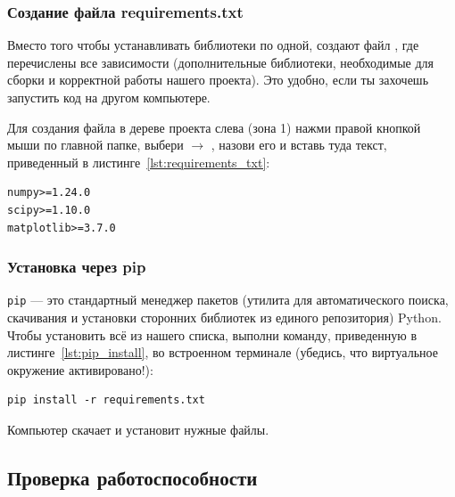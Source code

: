 \subsubsection{Создание файла requirements.txt}

Вместо того чтобы устанавливать библиотеки по одной, создают файл , где перечислены все зависимости (дополнительные библиотеки, необходимые для сборки и корректной работы нашего проекта). Это удобно, если ты захочешь запустить код на другом компьютере.

Для создания файла в дереве проекта слева (зона 1) нажми правой кнопкой мыши по главной папке, выбери  $\rightarrow$ , назови его  и вставь туда текст, приведенный в листинге~\ref{lst:requirements_txt}:

\begin{listing}[H]
	\caption{Содержимое файла requirements.txt}\label{lst:requirements_txt}
	\begin{verbatim}
numpy>=1.24.0
scipy>=1.10.0
matplotlib>=3.7.0
	\end{verbatim}
\end{listing}



\subsubsection{Установка через pip}

\texttt{pip} — это стандартный менеджер пакетов (утилита для автоматического поиска, скачивания и установки сторонних библиотек из единого репозитория) Python. Чтобы установить всё из нашего списка, выполни команду, приведенную в листинге~\ref{lst:pip_install}, во встроенном терминале (убедись, что виртуальное окружение активировано!):

\begin{listing}[H]
	\caption{Команда установки библиотек}\label{lst:pip_install}
	\begin{verbatim}
pip install -r requirements.txt
	\end{verbatim}
\end{listing}



Компьютер скачает и установит нужные файлы.

\subsection{Проверка работоспособности}


